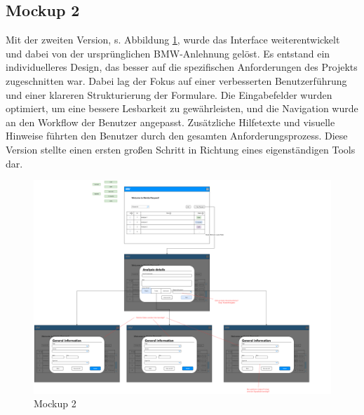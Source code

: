 \subsection*{Mockup 2}
Mit der zweiten Version, s. Abbildung \ref{fig:MockUps2.0}, wurde das Interface weiterentwickelt und dabei von der ursprünglichen BMW-Anlehnung gelöst. Es entstand ein individuelleres Design, das besser auf die spezifischen Anforderungen des Projekts zugeschnitten war. Dabei lag der Fokus auf einer verbesserten Benutzerführung und einer klareren Strukturierung der Formulare. Die Eingabefelder wurden optimiert, um eine bessere Lesbarkeit zu gewährleisten, und die Navigation wurde an den Workflow der Benutzer angepasst. Zusätzliche Hilfetexte und visuelle Hinweise führten den Benutzer durch den gesamten Anforderungsprozess. Diese Version stellte einen ersten großen Schritt in Richtung eines eigenständigen Tools dar.
\begin{figure}[H]
    \centering
    \includegraphics[scale=.2]{media/MockUps2.0}
    \caption{Mockup 2}
    \label{fig:MockUps2.0}
\end{figure}
